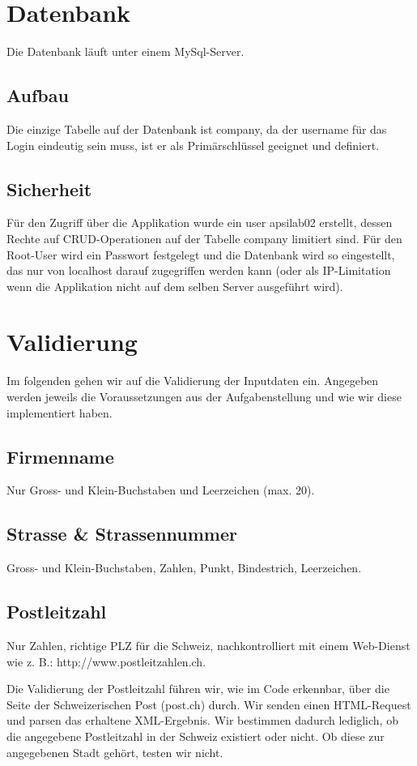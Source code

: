 \documentclass[12pt]{scrartcl}
\begin{document}
\section{Datenbank}
Die Datenbank läuft unter einem MySql-Server.
\subsection{Aufbau}
Die einzige Tabelle auf der Datenbank ist company, da der username für das Login eindeutig sein muss, ist er als Primärschlüssel geeignet und definiert.

\subsection{Sicherheit}
Für den Zugriff über die Applikation wurde ein user apsilab02 erstellt, dessen Rechte auf CRUD-Operationen auf der Tabelle company limitiert sind. Für den Root-User wird ein Passwort festgelegt und die Datenbank wird so eingestellt, das nur von localhost darauf zugegriffen werden kann (oder als IP-Limitation wenn die Applikation nicht auf dem selben Server ausgeführt wird).
\section{Validierung}
Im folgenden gehen wir auf die Validierung der Inputdaten ein. Angegeben werden jeweils die Voraussetzungen aus der Aufgabenstellung und wie wir diese implementiert haben.

\subsection{Firmenname}
Nur Gross- und Klein-Buchstaben und Leerzeichen (max. 20).


\subsection{Strasse \& Strassennummer}
Gross- und Klein-Buchstaben, Zahlen, Punkt, Bindestrich, Leerzeichen.


\subsection{Postleitzahl}
Nur Zahlen, richtige PLZ für die Schweiz, nachkontrolliert mit einem Web-Dienst wie z. B.: http://www.postleitzahlen.ch.


Die Validierung der Postleitzahl führen wir, wie im Code erkennbar, über die Seite der Schweizerischen Post (post.ch) durch. Wir senden einen HTML-Request und parsen das erhaltene XML-Ergebnis. Wir bestimmen dadurch lediglich, ob die angegebene Postleitzahl in der Schweiz existiert oder nicht. Ob diese zur angegebenen Stadt gehört, testen wir nicht.
\newpage
\end{document}
